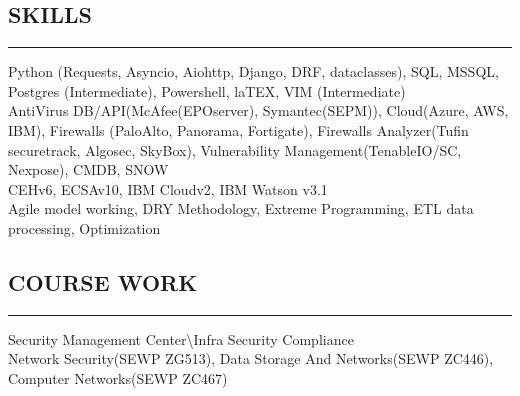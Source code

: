 \documentclass[10pt,a4]{article}
\begin{document}
\begin{small}
\subsection*{\color{dark_blue}SKILLS}
\vspace{-0.15cm}
\hrule
\vspace{0.1cm}
 Python {\color{gray}(Requests, Asyncio, Aiohttp, Django, DRF, dataclasses)}, SQL, MSSQL, Postgres {\color{gray}(Intermediate)}, Powershell, laTEX, VIM {\color{gray}(Intermediate)} \vspace{-0.25cm}\\

 AntiVirus DB/API{\color{gray}(McAfee(EPOserver), Symantec(SEPM))}, Cloud{\color{gray}(Azure, AWS, IBM)}, Firewalls {\color{gray}(PaloAlto, Panorama, Fortigate)}, Firewalls Analyzer{\color{gray}(Tufin securetrack, Algosec, SkyBox)},  Vulnerability Management{\color{gray}(TenableIO/SC, Nexpose)}, CMDB, SNOW  \vspace{-0.25cm}\\

 CEHv6, ECSAv10, IBM Cloudv2, IBM Watson v3.1  \vspace{-0.25cm}\\

{\noindent Agile model working, DRY Methodology, Extreme Programming, ETL data processing, Optimization}

\subsection*{\color{dark_blue}COURSE WORK}
\vspace{-0.15cm}
\hrule
\vspace{0.1cm}
 Security Management Center\textbackslash Infra Security Compliance \vspace{-0.25cm}\\

  Network Security{\color{gray}(SEWP ZG513)}, Data Storage And Networks{\color{gray}(SEWP ZC446)}, Computer Networks{\color{gray}(SEWP ZC467)} \vspace{-0.25cm}\\


\end{small}
\end{document}
